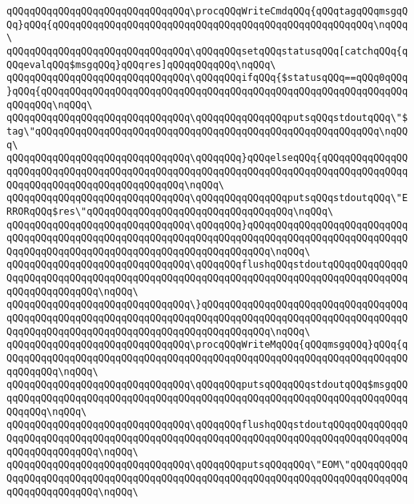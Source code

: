 \verb|qQQqqQQqqQQqqQQqqQQqqQQqqQQqqQQq\procqQQqWriteCmdqQQq{qQQqtagqQQqmsgqQQq}qQQq{qQQqqQQqqQQqqQQqqQQqqQQqqQQqqQQqqQQqqQQqqQQqqQQqqQQqqQQq\nqQQq\|\newline
\verb|qQQqqQQqqQQqqQQqqQQqqQQqqQQqqQQq\qQQqqQQqsetqQQqstatusqQQq[catchqQQq{qQQqevalqQQq$msgqQQq}qQQqres]qQQqqQQqqQQq\nqQQq\|\newline
\verb|qQQqqQQqqQQqqQQqqQQqqQQqqQQqqQQq\qQQqqQQqifqQQq{$statusqQQq==qQQq0qQQq}qQQq{qQQqqQQqqQQqqQQqqQQqqQQqqQQqqQQqqQQqqQQqqQQqqQQqqQQqqQQqqQQqqQQqqQQqqQQq\nqQQq\|\newline
\verb|qQQqqQQqqQQqqQQqqQQqqQQqqQQqqQQq\qQQqqQQqqQQqqQQqputsqQQqstdoutqQQq\"$tag\"qQQqqQQqqQQqqQQqqQQqqQQqqQQqqQQqqQQqqQQqqQQqqQQqqQQqqQQqqQQq\nqQQq\|\newline
\verb|qQQqqQQqqQQqqQQqqQQqqQQqqQQqqQQq\qQQqqQQq}qQQqelseqQQq{qQQqqQQqqQQqqQQqqQQqqQQqqQQqqQQqqQQqqQQqqQQqqQQqqQQqqQQqqQQqqQQqqQQqqQQqqQQqqQQqqQQqqQQqqQQqqQQqqQQqqQQqqQQqqQQqqQQq\nqQQq\|\newline
\verb|qQQqqQQqqQQqqQQqqQQqqQQqqQQqqQQq\qQQqqQQqqQQqqQQqputsqQQqstdoutqQQq\"ERRORqQQq$res\"qQQqqQQqqQQqqQQqqQQqqQQqqQQqqQQqqQQq\nqQQq\|\newline
\verb|qQQqqQQqqQQqqQQqqQQqqQQqqQQqqQQq\qQQqqQQq}qQQqqQQqqQQqqQQqqQQqqQQqqQQqqQQqqQQqqQQqqQQqqQQqqQQqqQQqqQQqqQQqqQQqqQQqqQQqqQQqqQQqqQQqqQQqqQQqqQQqqQQqqQQqqQQqqQQqqQQqqQQqqQQqqQQqqQQqqQQqqQQq\nqQQq\|\newline
\verb|qQQqqQQqqQQqqQQqqQQqqQQqqQQqqQQq\qQQqqQQqflushqQQqstdoutqQQqqQQqqQQqqQQqqQQqqQQqqQQqqQQqqQQqqQQqqQQqqQQqqQQqqQQqqQQqqQQqqQQqqQQqqQQqqQQqqQQqqQQqqQQqqQQqqQQq\nqQQq\|\newline
\verb|qQQqqQQqqQQqqQQqqQQqqQQqqQQqqQQq\}qQQqqQQqqQQqqQQqqQQqqQQqqQQqqQQqqQQqqQQqqQQqqQQqqQQqqQQqqQQqqQQqqQQqqQQqqQQqqQQqqQQqqQQqqQQqqQQqqQQqqQQqqQQqqQQqqQQqqQQqqQQqqQQqqQQqqQQqqQQqqQQqqQQqqQQq\nqQQq\|\newline
\verb|qQQqqQQqqQQqqQQqqQQqqQQqqQQqqQQq\procqQQqWriteMqQQq{qQQqmsgqQQq}qQQq{qQQqqQQqqQQqqQQqqQQqqQQqqQQqqQQqqQQqqQQqqQQqqQQqqQQqqQQqqQQqqQQqqQQqqQQqqQQqqQQq\nqQQq\|\newline
\verb|qQQqqQQqqQQqqQQqqQQqqQQqqQQqqQQq\qQQqqQQqputsqQQqqQQqstdoutqQQq$msgqQQqqQQqqQQqqQQqqQQqqQQqqQQqqQQqqQQqqQQqqQQqqQQqqQQqqQQqqQQqqQQqqQQqqQQqqQQqqQQq\nqQQq\|\newline
\verb|qQQqqQQqqQQqqQQqqQQqqQQqqQQqqQQq\qQQqqQQqflushqQQqstdoutqQQqqQQqqQQqqQQqqQQqqQQqqQQqqQQqqQQqqQQqqQQqqQQqqQQqqQQqqQQqqQQqqQQqqQQqqQQqqQQqqQQqqQQqqQQqqQQqqQQq\nqQQq\|\newline
\verb|qQQqqQQqqQQqqQQqqQQqqQQqqQQqqQQq\qQQqqQQqputsqQQqqQQq\"EOM\"qQQqqQQqqQQqqQQqqQQqqQQqqQQqqQQqqQQqqQQqqQQqqQQqqQQqqQQqqQQqqQQqqQQqqQQqqQQqqQQqqQQqqQQqqQQqqQQq\nqQQq\|\newline
